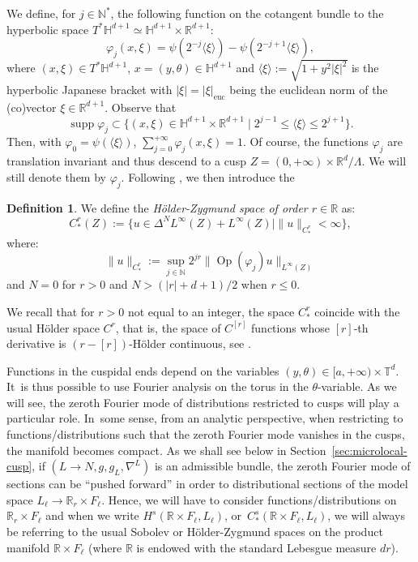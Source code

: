 \documentclass[JEP,XML,SOM,Unicode,NoFloatCountersInSection]{cedram}
\newcommand{\R}{\mathbb{R}}
\newcommand{\T}{\mathbb{T}}
\newcommand{\N}{\mathbb{N}}
\newcommand{\HH}{\mathbb{H}}
\DeclareMathOperator{\Op}{Op}
\DeclareMathOperator{\supp}{supp}
\theoremstyle{plain}
\theoremstyle{definition}
\newtheorem{definition}{Definition}[section]
\begin{document}
We define, for $j \in \N^\ast$, the following function on the cotangent bundle to the hyperbolic space $T^* \HH^{d+1} \simeq \HH^{d+1}\times \R^{d+1}$:
\begin{equation}
\label{equation:definition-phi-j}
\varphi_j(x,\xi) = \psi(2^{-j}\langle \xi \rangle)-\psi(2^{-j+1}\langle \xi \rangle),
\end{equation}
where $(x,\xi) \in T^*\HH^{d+1}$, $x = (y,\theta) \in \HH^{d+1}$ and $\langle \xi \rangle := \sqrt{1 + y^2|\xi|^2}$ is the hyperbolic Japanese bracket with $|\xi| = |\xi|_{\mathrm{euc}}$ being the euclidean norm of the (co)vector $\xi \in \R^{d+1}$. Observe that
\[
\supp \varphi_j \subset \bigl\{ (x,\xi) \in \HH^{d+1} \times \R^{d+1} \mid 2^{j-1} \leq \langle \xi \rangle \leq 2^{j+1}\bigr\}.
\]
Then, with $\varphi_0 = \psi(\langle \xi\rangle)$, $\sum_{j=0}^{+\infty} \varphi_j(x,\xi) = 1$. Of course, the functions $\varphi_j$ are translation invariant and thus descend to a cusp $Z = (0,+\infty) \times \R^d/\Lambda$. We will still denote them by $\varphi_j$. Following \cite[Def.\,3.1]{Bonthonneau-Lefeuvre-19-1}, we then introduce the

\begin{definition}
We define the \emph{Hölder-Zygmund space of order $r \in \R$} as:
\[
C^r_*(Z) := \bigl\{ u \in \Delta^N L^\infty(Z)+L^\infty(Z)\mid \|u\|_{C^r_*} < \infty \bigr\},
\]
where:
\[
\|u\|_{C^r_*} := \sup_{j \in \N} 2^{jr} \|\Op(\varphi_j)u\|_{L^\infty(Z)}
\]
and $N =0$ for $r>0$ and $N> (|r|+d+1)/2$ when $r\leq 0$.
\end{definition}

We recall that for $r > 0$ not equal to an integer, the space $C^r_*$ coincide with the usual Hölder space $C^r$, that is, the space of $C^{[r]}$ functions whose $[r]$-th derivative is $(r-[r])$-Hölder continuous, see \cite[Prop.\,3.2]{Bonthonneau-Lefeuvre-19-1}.

Functions in the cuspidal ends depend on the variables $(y,\theta) \in [a,+\infty) \times \T^d$. It~is thus possible to use Fourier analysis on the torus in the $\theta$-variable. As we will see, the zeroth Fourier mode of distributions restricted to cusps will play a particular role. In~some sense, from an analytic perspective, when restricting to functions/distributions such that the zeroth Fourier mode vanishes in the cusps, the manifold becomes compact. As we shall see below in Section~\ref{sec:microlocal-cusp}, if $(L\to N,g,g_L,\nabla^L)$ is an admissible bundle, the zeroth Fourier mode of sections can be ``pushed forward'' in order to distributional sections of the model space $L_\ell\to \R_r\times F_\ell$. Hence, we will have to consider functions/distributions on $\R_r \times F_\ell$ and when we write $H^s(\R\times F_\ell,L_\ell)$, or~$C^s_\ast(\R\times F_\ell, L_\ell)$, we will always be referring to the usual Sobolev or Hölder-Zygmund spaces on the product manifold $\R \times F_\ell$ (where $\R$ is endowed with the standard Lebesgue measure $dr$).
\end{document}

